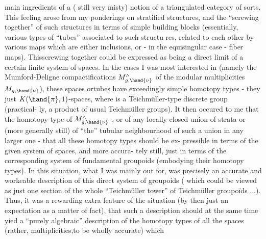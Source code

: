 main ingredients of a ( still very misty) notion of a triangulated category
of sorts\hand{)}. This feeling arose from my  ponderings on stratified structures,
and the ``screwing together'' of such structures in terms of simple building
blocks (essentially,  various types of ``tubes'' associated to such structu%
res,  related to each other by various  maps which are either inclusions,
or  -  in the equisingular case  -  fiber maps).  Thisscrewing together
 could be expressed as being a direct limit of a certain finite system of
spaces.   In the cases I was most interested in (namely the Mumford-Deligne
compactifications $M^{\wedge}_{g,\hand{\nu}}$  of the modular multiplicities  $M_{g,\hand{\nu}}$),  these
spaces ortubes have exceedingly simple homotopy types  -  they   just
$K(\hand{\pi},1)$-spaces,  where   \hand{$\pi$} is a Teichmüller-type discrete group (practical-%
ly,  a product of usual Teichmüller groups).  It then occured to me that
the  homotopy type of $M^{\wedge}_{g,\hand{\nu}}$ ,  or of any locally closed union of strata\hand{,}
or (more generally still) of ``the'' tubular neighbourhood of  such a
union in any larger one\hand{,}  -  that all these homotopy types should be ex-%
pressible in terms of the given  system of spaces,  and more accura-%
tely still,  just in terms of the corresponding system of fundamental
groupoids (embodying their homotopy types).  In this situation,  what I
was mainly out for,  was precisely an accurate and workeable description
of this direct system of groupoids  (  which could be viewed as just one
section of the whole ``Teichmüller tower'' of Teichmüller groupoïds ...).
Thus,  it was a rewarding extra feature of the situation (by then just an
expectation\hand{,} as a matter of fact),  that such a description should at the
same time yied a ``purely algebraic'' description of the homotopy types
of all the spaces (rather,  multiplicities,to be wholly accurate) which
